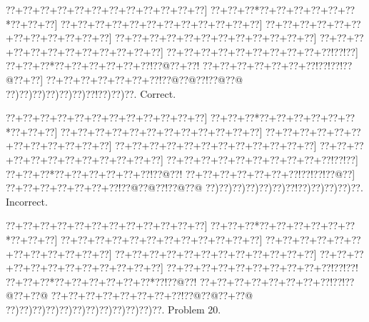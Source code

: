 \documentclass[a5paper]{article}
\begin{document}
\begin{center}
{\goo
\0??+\0??+\0??+\0??+\0??+\0??+\0??+\0??+\0??+\0??+\0??+\0??]
\0??+\0??+\0??*\0??+\0??+\0??+\0??+\0??+\0??*\0??+\0??+\0??]
\0??+\0??+\0??+\0??+\0??+\0??+\0??+\0??+\0??+\0??+\0??+\0??]
\0??+\0??+\0??+\0??+\0??+\0??+\0??+\0??+\0??+\0??+\0??+\0??]
\0??+\0??+\0??+\0??+\0??+\0??+\0??+\0??+\0??+\0??+\0??+\0??]
\0??+\0??+\0??+\0??+\0??+\0??+\0??+\0??+\0??+\0??+\0??+\0??]
\0??+\0??+\0??+\0??+\0??+\0??+\0??+\0??+\0??+\0??!\0??!\0??]
\0??+\0??+\0??*\0??+\0??+\0??+\0??+\0??+\0??!\0??@\0??+\0??!
\0??+\0??+\0??+\0??+\0??+\0??+\0??!\0??!\0??!\0??@\0??+\0??]
\0??+\0??+\0??+\0??+\0??+\0??+\0??!\0??@\0??@\0??!\0??@\0??@
\0??)\0??)\0??)\0??)\0??)\0??)\0??!\0??)\0??)\0??.
}
Correct. 

\end{center}
\begin{center}
{\goo
\0??+\0??+\0??+\0??+\0??+\0??+\0??+\0??+\0??+\0??+\0??+\0??]
\0??+\0??+\0??*\0??+\0??+\0??+\0??+\0??+\0??*\0??+\0??+\0??]
\0??+\0??+\0??+\0??+\0??+\0??+\0??+\0??+\0??+\0??+\0??+\0??]
\0??+\0??+\0??+\0??+\0??+\0??+\0??+\0??+\0??+\0??+\0??+\0??]
\0??+\0??+\0??+\0??+\0??+\0??+\0??+\0??+\0??+\0??+\0??+\0??]
\0??+\0??+\0??+\0??+\0??+\0??+\0??+\0??+\0??+\0??+\0??+\0??]
\0??+\0??+\0??+\0??+\0??+\0??+\0??+\0??+\0??+\0??!\0??!\0??]
\0??+\0??+\0??*\0??+\0??+\0??+\0??+\0??+\0??!\0??@\0??!
\0??+\0??+\0??+\0??+\0??+\0??+\0??!\0??!\0??!\0??@\0??]
\0??+\0??+\0??+\0??+\0??+\0??+\0??!\0??@\0??@\0??!\0??@\0??@
\0??)\0??)\0??)\0??)\0??)\0??)\0??!\0??)\0??)\0??)\0??)\0??.
}
Incorrect. 

\end{center}
\newpage
\begin{center}
{\goo
\0??+\0??+\0??+\0??+\0??+\0??+\0??+\0??+\0??+\0??+\0??+\0??]
\0??+\0??+\0??*\0??+\0??+\0??+\0??+\0??+\0??*\0??+\0??+\0??]
\0??+\0??+\0??+\0??+\0??+\0??+\0??+\0??+\0??+\0??+\0??+\0??]
\0??+\0??+\0??+\0??+\0??+\0??+\0??+\0??+\0??+\0??+\0??+\0??]
\0??+\0??+\0??+\0??+\0??+\0??+\0??+\0??+\0??+\0??+\0??+\0??]
\0??+\0??+\0??+\0??+\0??+\0??+\0??+\0??+\0??+\0??+\0??+\0??]
\0??+\0??+\0??+\0??+\0??+\0??+\0??+\0??+\0??+\0??!\0??!\0??!
\0??+\0??+\0??*\0??+\0??+\0??+\0??+\0??+\0??*\0??!\0??@\0??!
\0??+\0??+\0??+\0??+\0??+\0??+\0??+\0??!\0??!\0??@\0??+\0??@
\0??+\0??+\0??+\0??+\0??+\0??+\0??+\0??!\0??@\0??@\0??+\0??@
\0??)\0??)\0??)\0??)\0??)\0??)\0??)\0??)\0??)\0??)\0??)\0??.
}
Problem 20.

\end{center}
\end{document}
